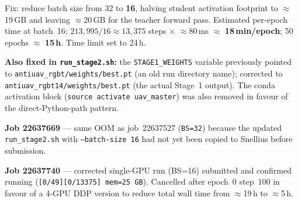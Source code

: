 Fix: reduce batch size from 32 to \textbf{16}, halving student
activation footprint to $\approx$19\,GB and leaving $\approx$20\,GB
for the teacher forward pass. Estimated per-epoch time at
batch~16: $213{,}995 / 16 \approx 13{,}375$ steps
$\times$ $\approx$80\,ms $\approx$ \textbf{18\,min/epoch};
50 epochs $\approx$ \textbf{15\,h}. Time limit set to 24\,h.

\textbf{Also fixed in \texttt{run\_stage2.sh}:} the
\texttt{STAGE1\_WEIGHTS} variable previously pointed to
\texttt{antiuav\_rgbt/weights/best.pt} (an old run directory
name); corrected to \texttt{antiuav\_rgbt14/weights/best.pt}
(the actual Stage~1 output). The conda activation block
(\texttt{source activate uav\_master}) was also removed in
favour of the direct-Python-path pattern.

\textbf{Job 22637669} — same OOM as job~22637527 (\texttt{BS=32})
because the updated \texttt{run\_stage2.sh} with
\texttt{--batch-size 16} had not yet been copied to Snellius
before submission.

\textbf{Job 22637740} — corrected single-GPU run (BS=16) submitted
and confirmed running (\texttt{[0/49][0/13375] mem=25\,GB}). Cancelled
after epoch~0 step~100 in favour of a 4-GPU DDP version to reduce
total wall time from $\approx$19\,h to $\approx$5\,h.

